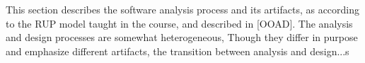 This section describes the software analysis process and its artifacts, as according to the RUP model taught in the course, and described in [OOAD]\cite{ooad}.
The analysis and design processes are somewhat heterogeneous, Though they differ in purpose and emphasize different artifacts, the transition between analysis and design...s
